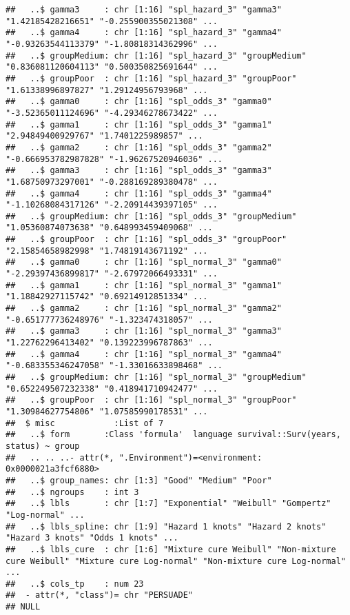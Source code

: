 \documentclass[
]{article}
\begin{document}
\begin{verbatim}
##   ..$ gamma3     : chr [1:16] "spl_hazard_3" "gamma3" "1.42185428216651" "-0.255900355021308" ...
##   ..$ gamma4     : chr [1:16] "spl_hazard_3" "gamma4" "-0.93263544113379" "-1.80818314362996" ...
##   ..$ groupMedium: chr [1:16] "spl_hazard_3" "groupMedium" "0.836081120604113" "0.500350825691644" ...
##   ..$ groupPoor  : chr [1:16] "spl_hazard_3" "groupPoor" "1.61338996897827" "1.29124956793968" ...
##   ..$ gamma0     : chr [1:16] "spl_odds_3" "gamma0" "-3.52365011124696" "-4.29346278673422" ...
##   ..$ gamma1     : chr [1:16] "spl_odds_3" "gamma1" "2.94849400929767" "1.7401225989857" ...
##   ..$ gamma2     : chr [1:16] "spl_odds_3" "gamma2" "-0.666953782987828" "-1.96267520946036" ...
##   ..$ gamma3     : chr [1:16] "spl_odds_3" "gamma3" "1.68750973297001" "-0.288169289380478" ...
##   ..$ gamma4     : chr [1:16] "spl_odds_3" "gamma4" "-1.10268084317126" "-2.20914439397105" ...
##   ..$ groupMedium: chr [1:16] "spl_odds_3" "groupMedium" "1.05360874073638" "0.648993459409068" ...
##   ..$ groupPoor  : chr [1:16] "spl_odds_3" "groupPoor" "2.15854658982998" "1.74819143671192" ...
##   ..$ gamma0     : chr [1:16] "spl_normal_3" "gamma0" "-2.29397436899817" "-2.67972066493331" ...
##   ..$ gamma1     : chr [1:16] "spl_normal_3" "gamma1" "1.18842927115742" "0.69214912851334" ...
##   ..$ gamma2     : chr [1:16] "spl_normal_3" "gamma2" "-0.651777736248976" "-1.323474318057" ...
##   ..$ gamma3     : chr [1:16] "spl_normal_3" "gamma3" "1.22762296413402" "0.139223996787863" ...
##   ..$ gamma4     : chr [1:16] "spl_normal_3" "gamma4" "-0.683355346247058" "-1.33016633898468" ...
##   ..$ groupMedium: chr [1:16] "spl_normal_3" "groupMedium" "0.652249507232338" "0.418941710942477" ...
##   ..$ groupPoor  : chr [1:16] "spl_normal_3" "groupPoor" "1.30984627754806" "1.07585990178531" ...
##  $ misc            :List of 7
##   ..$ form       :Class 'formula'  language survival::Surv(years, status) ~ group
##   .. .. ..- attr(*, ".Environment")=<environment: 0x0000021a3fcf6880> 
##   ..$ group_names: chr [1:3] "Good" "Medium" "Poor"
##   ..$ ngroups    : int 3
##   ..$ lbls       : chr [1:7] "Exponential" "Weibull" "Gompertz" "Log-normal" ...
##   ..$ lbls_spline: chr [1:9] "Hazard 1 knots" "Hazard 2 knots" "Hazard 3 knots" "Odds 1 knots" ...
##   ..$ lbls_cure  : chr [1:6] "Mixture cure Weibull" "Non-mixture cure Weibull" "Mixture cure Log-normal" "Non-mixture cure Log-normal" ...
##   ..$ cols_tp    : num 23
##  - attr(*, "class")= chr "PERSUADE"
## NULL
\end{verbatim}

\clearpage
\end{document}
